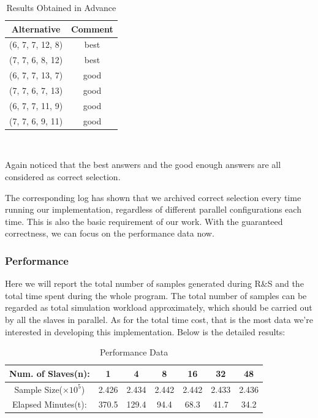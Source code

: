 \begin{table}[ht]
\begin{center}
\begin{tabular}{|c|c|}
\hline
Alternative & Comment \\
\hline
(6, 7, 7, 12, 8) & best \\
(7, 7, 6, 8, 12) & best \\
(6, 7, 7, 13, 7) & good \\
(7, 7, 6, 7, 13) & good \\
(6, 7, 7, 11, 9) & good \\
(7, 7, 6, 9, 11) & good \\
\hline
\end{tabular} \\
\caption{Results Obtained in Advance}
\end{center}
\end{table}

Again noticed that the best answers and the good enough answers are all considered as correct selection.

The corresponding log has shown that we archived correct selection every time running our implementation, regardless of different parallel configurations each time. This is also the basic requirement of our work. With the guaranteed correctness, we can focus on the performance data now.

\subsubsection{Performance}

Here we will report the total number of samples generated during R\&S and the total time spent during the whole program. The total number of samples can be regarded as total simulation workload approximately, which should be carried out by all the slaves in parallel. As for the total time cost, that is the most data we're interested in developing this implementation. Below is the detailed results:

\begin{table}[ht]
\begin{center}
\begin{tabular}{|c|c|c|c|c|c|c|}
\hline
Num. of Slaves(n): & 1 & 4 & 8 & 16 & 32 & 48 \\
\hline
Sample Size($\times 10^5$) & 2.426 & 2.434 & 2.442 & 2.442 & 2.433 & 2.436\\
\hline
Elapsed Minutes(t): & 370.5 & 129.4 & 94.4 & 68.3 & 41.7 & 34.2 \\
\hline
\end{tabular} \\
\caption{Performance Data}
\end{center}
\end{table}

